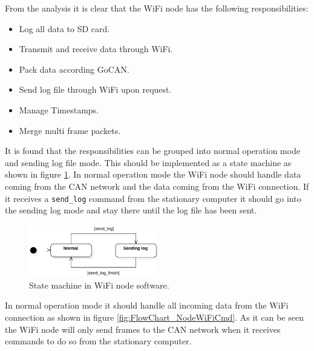 From the analysis it is clear that the WiFi node has the following responsibilities:

\begin{itemize}
\item Log all data to SD card.
\item Transmit and receive data through WiFi.
\item Pack data according GoCAN.
\item Send log file through WiFi upon request.
\item Manage Timestamps.
\item Merge multi frame packets.
\end{itemize}

It is found that the responsibilities can be grouped into normal operation mode and sending log file mode.
This should be implemented as a state machine as shown in figure \ref{fig:StateDiagram_NodeWiFiStates}.
In normal operation mode the WiFi node should handle data coming from the CAN network and the data coming from the WiFi connection.
If it receives a \texttt{send\_log} command from the stationary computer it should go into the sending log mode and stay there until the log file has been sent.\\

\begin{figure}[!h]
\centering
\includegraphics[width=0.5\textwidth]{graphics/StateDiagram_NodeWiFiStates}
\caption{State machine in WiFi node software.}
\label{fig:StateDiagram_NodeWiFiStates}
\end{figure}

In normal operation mode it should handle all incoming data from the WiFi connection as shown in figure \ref{fig:FlowChart_NodeWiFiCmd}.
As it can be seen the WiFi node will only send frames to the CAN network when it receives commands to do so from the stationary computer.\\

